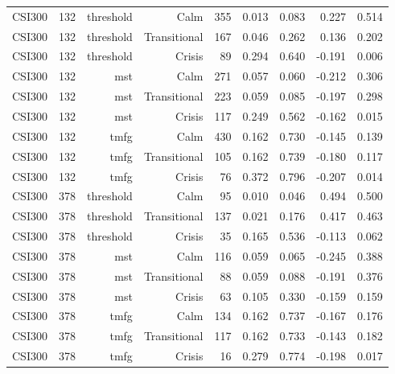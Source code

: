 \begin{tabular}{lrrrrrrrr}
CSI300 & 132 & threshold & Calm & 355 & 0.013 & 0.083 & 0.227 & 0.514 \\
CSI300 & 132 & threshold & Transitional & 167 & 0.046 & 0.262 & 0.136 & 0.202 \\
CSI300 & 132 & threshold & Crisis & 89 & 0.294 & 0.640 & -0.191 & 0.006 \\
CSI300 & 132 & mst & Calm & 271 & 0.057 & 0.060 & -0.212 & 0.306 \\
CSI300 & 132 & mst & Transitional & 223 & 0.059 & 0.085 & -0.197 & 0.298 \\
CSI300 & 132 & mst & Crisis & 117 & 0.249 & 0.562 & -0.162 & 0.015 \\
CSI300 & 132 & tmfg & Calm & 430 & 0.162 & 0.730 & -0.145 & 0.139 \\
CSI300 & 132 & tmfg & Transitional & 105 & 0.162 & 0.739 & -0.180 & 0.117 \\
CSI300 & 132 & tmfg & Crisis & 76 & 0.372 & 0.796 & -0.207 & 0.014 \\
CSI300 & 378 & threshold & Calm & 95 & 0.010 & 0.046 & 0.494 & 0.500 \\
CSI300 & 378 & threshold & Transitional & 137 & 0.021 & 0.176 & 0.417 & 0.463 \\
CSI300 & 378 & threshold & Crisis & 35 & 0.165 & 0.536 & -0.113 & 0.062 \\
CSI300 & 378 & mst & Calm & 116 & 0.059 & 0.065 & -0.245 & 0.388 \\
CSI300 & 378 & mst & Transitional & 88 & 0.059 & 0.088 & -0.191 & 0.376 \\
CSI300 & 378 & mst & Crisis & 63 & 0.105 & 0.330 & -0.159 & 0.159 \\
CSI300 & 378 & tmfg & Calm & 134 & 0.162 & 0.737 & -0.167 & 0.176 \\
CSI300 & 378 & tmfg & Transitional & 117 & 0.162 & 0.733 & -0.143 & 0.182 \\
CSI300 & 378 & tmfg & Crisis & 16 & 0.279 & 0.774 & -0.198 & 0.017 \\
\bottomrule
\end{tabular}
